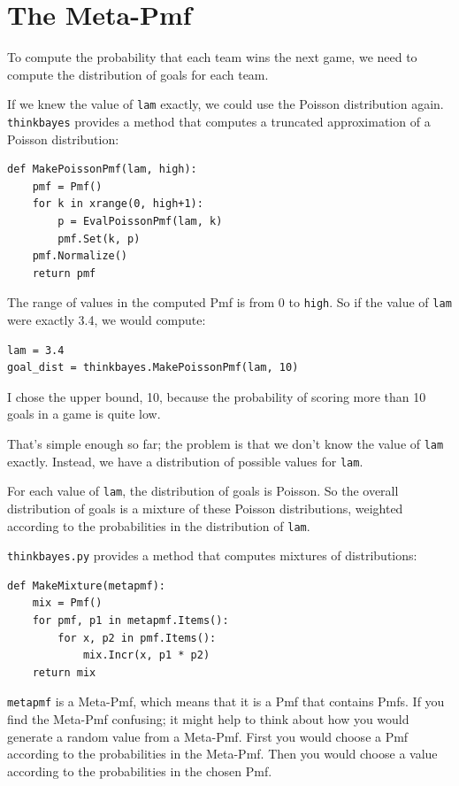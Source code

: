 \documentclass[12pt]{book}
\begin{document}
\section{The Meta-Pmf}

To compute the probability that each team wins the next game,
we need to compute the distribution of goals for each team.

If we knew the value of {\tt lam} exactly, we could use the
Poisson distribution again.  \verb"thinkbayes" provides a
method that computes a truncated approximation of a Poisson
distribution:

\begin{verbatim}
def MakePoissonPmf(lam, high):
    pmf = Pmf()
    for k in xrange(0, high+1):
        p = EvalPoissonPmf(lam, k)
        pmf.Set(k, p)
    pmf.Normalize()
    return pmf
\end{verbatim}  

The range of values in the computed Pmf is from 0 to {\tt high}.
So if the value of {\tt lam} were exactly 3.4, we would compute:

\begin{verbatim}
lam = 3.4
goal_dist = thinkbayes.MakePoissonPmf(lam, 10)
\end{verbatim}

I chose the upper bound, 10, because the probability of scoring
more than 10 goals in a game is quite low.

That's simple enough so far; the problem is that we don't know
the value of {\tt lam} exactly.  Instead, we have a distribution
of possible values for {\tt lam}.

For each value of {\tt lam}, the distribution of goals is Poisson.
So the overall distribution of goals is a mixture of these
Poisson distributions, weighted according to the probabilities
in the distribution of {\tt lam}.

\verb"thinkbayes.py" provides a method that computes mixtures
of distributions:

\begin{verbatim}
def MakeMixture(metapmf):
    mix = Pmf()
    for pmf, p1 in metapmf.Items():
        for x, p2 in pmf.Items():
            mix.Incr(x, p1 * p2)
    return mix
\end{verbatim}  

{\tt metapmf} is a Meta-Pmf, which means that it is a Pmf that
contains Pmfs.  If you find the Meta-Pmf confusing; it might
help to think about how you would generate a random value from
a Meta-Pmf.  First you would choose a Pmf according to the
probabilities in the Meta-Pmf.  Then you would choose a value
according to the probabilities in the chosen Pmf.
\end{document}
